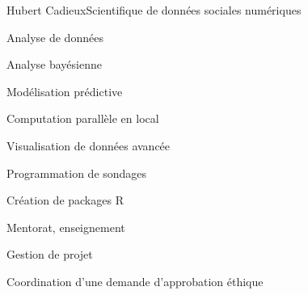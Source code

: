 \documentclass{article}
\begin{document}
\begin{cv}[avatar]{Hubert Cadieux}{Scientifique de données sociales numériques}

\small{
\begin{cvitem}
    Analyse de données
\end{cvitem}
\begin{cvitem}
    Analyse bayésienne
\end{cvitem}
\begin{cvitem}
    Modélisation prédictive
\end{cvitem}
\begin{cvitem}
    Computation parallèle en local
\end{cvitem}
\begin{cvitem}
    Visualisation de données avancée
\end{cvitem}
\begin{cvitem}
    Programmation de sondages
\end{cvitem}
\begin{cvitem}
    Création de packages R
\end{cvitem}
\begin{cvitem}
    Mentorat, enseignement
\end{cvitem}
\begin{cvitem}
    Gestion de projet
\end{cvitem}
\begin{cvitem}
    Coordination d'une demande d'approbation éthique
\end{cvitem}
}


\end{cv}
\end{document}
